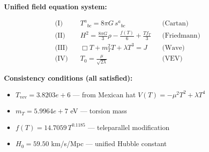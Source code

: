 
\textbf{Unified field equation system:}

\begin{align}
  \text{(I)} \quad & T^a{}_{bc} = 8\pi G \, s^a{}_{bc} && \text{(Cartan)} \\
  \text{(II)} \quad & H^2 = \frac{8\pi G}{3}\rho - \frac{f(T)}{6} + \frac{Tf_T}{3} && \text{(Friedmann)} \\
  \text{(III)} \quad & \Box T + m_T^2 T + \lambda T^3 = J && \text{(Wave)} \\
  \text{(IV)} \quad & T_0 = \frac{\mu}{\sqrt{2\lambda}} && \text{(VEV)}
\end{align}

\textbf{Consistency conditions (all satisfied):}
\begin{itemize}
  \item $T_{\text{vev}} = 3.8203e+6$ — from Mexican hat $V(T) = -\mu^2 T^2 + \lambda T^4$
  \item $m_T = 5.9964e+7$ eV — torsion mass
  \item $f(T) = 14.7059 \, T^{0.1185}$ — teleparallel modification
  \item $H_0 = 59.50$ km/s/Mpc — unified Hubble constant
\end{itemize}